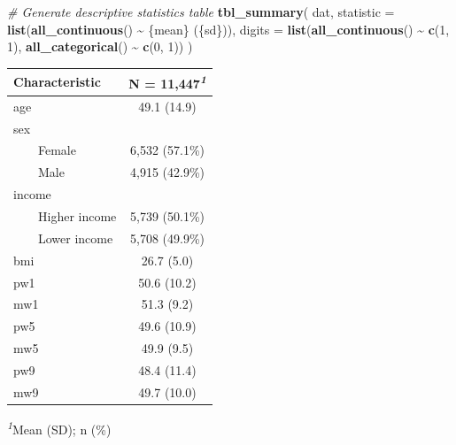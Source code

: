 \documentclass[
]{book}
\newenvironment{Shaded}{\begin{snugshade}}{\end{snugshade}}
\newcommand{\AttributeTok}[1]{\textcolor[rgb]{0.13,0.29,0.53}{#1}}
\newcommand{\CommentTok}[1]{\textcolor[rgb]{0.56,0.35,0.01}{\textit{#1}}}
\newcommand{\DecValTok}[1]{\textcolor[rgb]{0.00,0.00,0.81}{#1}}
\newcommand{\FunctionTok}[1]{\textcolor[rgb]{0.13,0.29,0.53}{\textbf{#1}}}
\newcommand{\NormalTok}[1]{#1}
\newcommand{\SpecialCharTok}[1]{\textcolor[rgb]{0.81,0.36,0.00}{\textbf{#1}}}
\newcommand{\StringTok}[1]{\textcolor[rgb]{0.31,0.60,0.02}{#1}}
\begin{document}
\begin{Shaded}
\begin{Highlighting}[]
\CommentTok{\# Generate descriptive statistics table}
\FunctionTok{tbl\_summary}\NormalTok{(}
\NormalTok{  dat, }
  \AttributeTok{statistic =} \FunctionTok{list}\NormalTok{(}\FunctionTok{all\_continuous}\NormalTok{() }\SpecialCharTok{\textasciitilde{}} \StringTok{\textquotesingle{}\{mean\} (\{sd\})\textquotesingle{}}\NormalTok{), }
  \AttributeTok{digits =} \FunctionTok{list}\NormalTok{(}\FunctionTok{all\_continuous}\NormalTok{() }\SpecialCharTok{\textasciitilde{}} \FunctionTok{c}\NormalTok{(}\DecValTok{1}\NormalTok{, }\DecValTok{1}\NormalTok{), }
                \FunctionTok{all\_categorical}\NormalTok{() }\SpecialCharTok{\textasciitilde{}} \FunctionTok{c}\NormalTok{(}\DecValTok{0}\NormalTok{, }\DecValTok{1}\NormalTok{))}
\NormalTok{)}
\end{Highlighting}
\end{Shaded}

\begin{table}[t]
\fontsize{12.0pt}{14.0pt}\selectfont
\begin{tabular*}{\linewidth}{@{\extracolsep{\fill}}lc}
\toprule
\textbf{Characteristic} & \textbf{N = 11,447}\textsuperscript{\textit{1}} \\ 
\midrule\addlinespace[2.5pt]
age & 49.1 (14.9) \\ 
sex &  \\ 
    Female & 6,532 (57.1\%) \\ 
    Male & 4,915 (42.9\%) \\ 
income &  \\ 
    Higher income & 5,739 (50.1\%) \\ 
    Lower income & 5,708 (49.9\%) \\ 
bmi & 26.7 (5.0) \\ 
pw1 & 50.6 (10.2) \\ 
mw1 & 51.3 (9.2) \\ 
pw5 & 49.6 (10.9) \\ 
mw5 & 49.9 (9.5) \\ 
pw9 & 48.4 (11.4) \\ 
mw9 & 49.7 (10.0) \\ 
\bottomrule
\end{tabular*}
\begin{minipage}{\linewidth}
\vspace{.05em}
\textsuperscript{\textit{1}}Mean (SD); n (\%)\\
\end{minipage}
\end{table}
\end{document}
